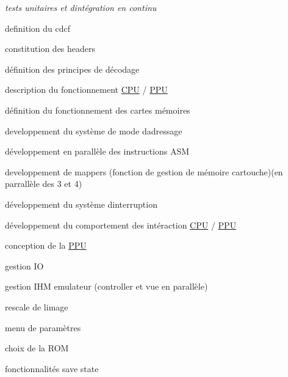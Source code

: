 {\itshape tests unitaires et d\textquotesingle{}intégration en continu}


\begin{DoxyEnumerate}
\item definition du cdcf
\item constitution des headers
\begin{DoxyEnumerate}
\item définition des principes de décodage
\item description du fonctionnement \hyperlink{struct_c_p_u}{C\+PU} / \hyperlink{struct_p_p_u}{P\+PU}
\item définition du fonctionnement des cartes mémoires
\end{DoxyEnumerate}
\item developpement du système de mode d\textquotesingle{}adressage
\item développement en parallèle des instructions A\+SM
\item developpement de mappers (fonction de gestion de mémoire cartouche)(en parrallèle des 3 et 4)
\item développement du système d\textquotesingle{}interruption
\item développement du comportement des intéraction \hyperlink{struct_c_p_u}{C\+PU} / \hyperlink{struct_p_p_u}{P\+PU}
\item conception de la \hyperlink{struct_p_p_u}{P\+PU}
\item gestion IO
\item gestion I\+HM emulateur (controller et vue en parallèle)
\begin{DoxyEnumerate}
\item rescale de l\textquotesingle{}image
\item menu de paramètres
\item choix de la R\+OM
\end{DoxyEnumerate}
\item fonctionnalités save state 
\end{DoxyEnumerate}